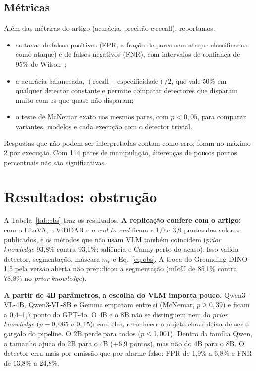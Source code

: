 \documentclass[journal,onecolumn]{IEEEtran}
\begin{document}
\subsection{Métricas}
Além das métricas do artigo (acurácia, precisão e recall), reportamos:
\begin{itemize}
\item as taxas de falsos positivos (FPR, a fração de pares sem ataque classificados como ataque) e de
  falsos negativos (FNR), com intervalos de confiança de 95\% de Wilson~\cite{wilson};
\item a acurácia balanceada, $(\text{recall}+\text{especificidade})/2$, que vale 50\% em qualquer
  detector constante e permite comparar detectores que disparam muito com os que quase não disparam;
\item o teste de McNemar exato nos mesmos pares, com $p<0{,}05$, para comparar variantes, modelos e
  cada execução com o detector trivial.
\end{itemize}
Respostas que não podem ser interpretadas contam como erro; foram no máximo 2 por execução. Com 114
pares de manipulação, diferenças de poucos pontos percentuais não são significativas.

\section{Resultados: obstrução}
\label{sec:obs}

A Tabela~\ref{tab:obs} traz os resultados. \textbf{A replicação confere com o artigo:} com o LLaVA, o
ViDDAR e o \emph{end-to-end} ficam a 1,0 e 3,9 pontos dos valores publicados, e os métodos que não
usam VLM também coincidem (\emph{prior knowledge} 93,8\% contra 93,1\%; saliência e Canny perto do
acaso). Isso valida detector, segmentação, máscara $m_c$ e Eq.~\eqref{eq:obs}. A troca do Grounding
DINO 1.5 pela versão aberta não prejudicou a segmentação (mIoU de 85,1\% contra 78,8\% no \emph{prior
knowledge}).

\textbf{A partir de 4B parâmetros, a escolha do VLM importa pouco.} Qwen3-VL-4B, Qwen3-VL-8B e Gemma
empatam entre si (McNemar, $p\geq 0{,}39$) e ficam a 0,4--1,7 ponto do GPT-4o. O 4B e o 8B não se
distinguem nem do \emph{prior knowledge} ($p=0{,}065$ e $0{,}15$): com eles, reconhecer o objeto-chave
deixa de ser o gargalo do pipeline. O 2B perde para todos ($p\leq 0{,}001$). Dentro da família Qwen, o
tamanho ajuda do 2B para o 4B (+6,9 pontos), mas não do 4B para o 8B. O detector erra mais por omissão
que por alarme falso: FPR de 1,9\% a 6,8\% e FNR de 13,8\% a 24,8\%.
\end{document}

